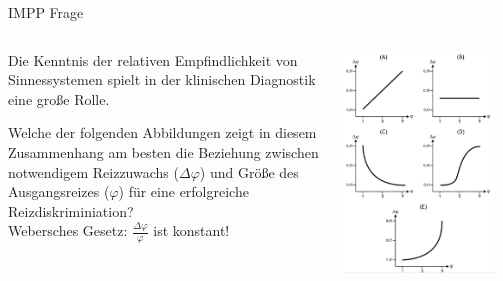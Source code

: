 \documentclass[aspectratio=169]{beamer}
\begin{document}
\begin{frame}{IMPP Frage}


\begin{columns}[c]
\begin{column}{6cm}
Die Kenntnis der relativen Empfindlichkeit von Sinnessystemen spielt in der klinischen Diagnostik eine große Rolle. 

Welche der folgenden Abbildungen zeigt in diesem Zusammenhang am besten die Beziehung zwischen \textcolor{theme}{notwendigem Reizzuwachs} (\( \Delta \varphi \)) und \textcolor{theme}{Größe des Ausgangsreizes} (\(\varphi\)) für eine erfolgreiche Reizdiskriminiation? \\[0.2 cm]


\textcolor{theme}{Webersches Gesetz: \(\frac{\Delta \varphi}{\varphi}\) ist konstant!}


\end{column}


\begin{column}{5cm}
\begin{center}
    \includegraphics[width=0.9\textwidth]{weber_IMPP.png}
\end{center}
\end{column}

\end{columns}
    
\end{frame}
\end{document}
